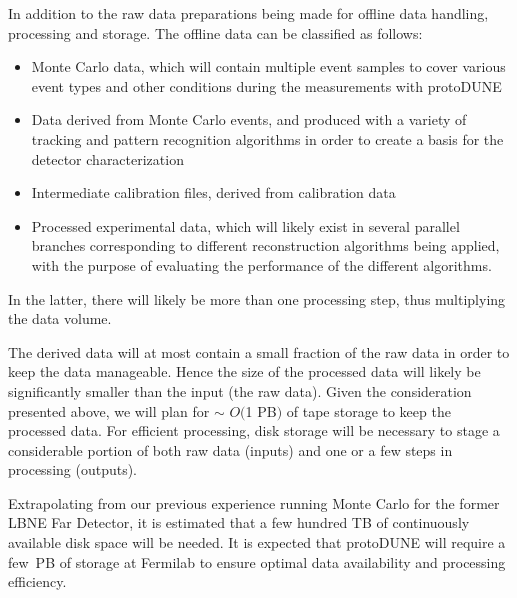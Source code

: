 In addition to the raw data preparations being made for offline data handling, processing and storage.
The offline data can be classified as follows:
\begin{itemize}
\item Monte Carlo data, which will contain multiple event samples to cover various event types and other conditions during the measurements
with protoDUNE

\item Data derived from Monte Carlo events, and produced with a variety of tracking and pattern recognition algorithms
in order to create a basis for the detector characterization

\item Intermediate calibration files, derived from calibration data

\item Processed experimental data, which will likely exist in several parallel branches corresponding to different reconstruction
algorithms being applied, with the purpose of evaluating the performance of the different algorithms.
\end{itemize}

In the latter, there will likely be more than one processing step, thus multiplying the data volume. 

The derived data will at most contain a small fraction of the raw data in order to keep the data manageable.
Hence the size of the processed data will likely be significantly smaller than the input (the raw data). 
Given the consideration presented above, we will plan for
$\sim$ $O($1 PB$)$ of tape storage to keep the processed data. 
For efficient processing, disk storage will be necessary
to stage a considerable portion of both raw data (inputs) and one or a few steps in processing (outputs).

Extrapolating from our previous experience running Monte Carlo for the former LBNE Far Detector, it is estimated
that  a few hundred TB of continuously available disk space will be needed. It is expected that protoDUNE will require
a few~PB of storage at Fermilab to ensure optimal data availability and  processing efficiency. 

